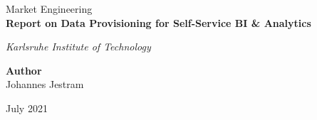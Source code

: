 \begin{titlepage}
  \begin{center}
    
    
    \vspace*{5.5cm}
    
    \Large
    Market Engineering \\
    \LARGE
    \textbf{Report on Data Provisioning for Self-Service BI & Analytics}
      
    \vspace{1cm}
    
    \textit{Karlsruhe Institute of Technology}
    
    \vspace{1cm}
      
    \Large      
    \textbf{Author}\\
    Johannes Jestram
    
    \vspace{2.5cm}
    
    \Large
    July 2021
      
\end{center}
\end{titlepage}  